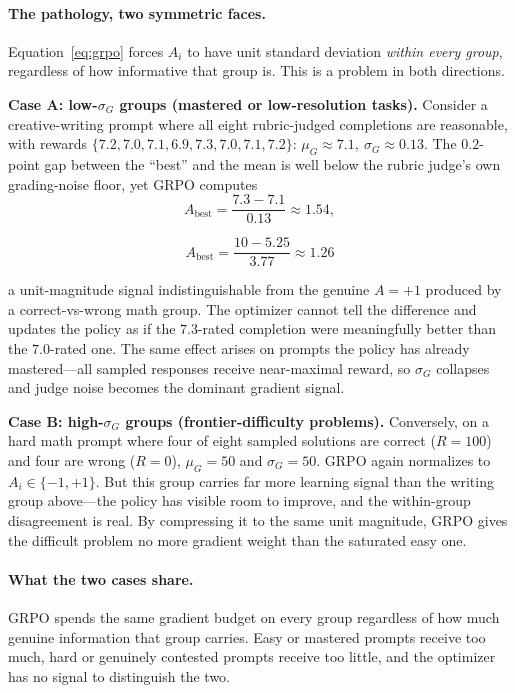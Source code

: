 \documentclass[10pt]{article}
\begin{document}
\paragraph{The pathology, two symmetric faces.}
Equation~\eqref{eq:grpo} forces $A_i$ to have unit standard deviation \emph{within
every group}, regardless of how informative that group is. This is a problem in
both directions.

\medskip
\noindent\textbf{Case A: low-$\sigma_G$ groups (mastered or low-resolution tasks).}
Consider a creative-writing prompt where all eight rubric-judged completions are
reasonable, with rewards $\{7.2, 7.0, 7.1, 6.9, 7.3, 7.0, 7.1, 7.2\}$:
$\mu_G \approx 7.1,\ \sigma_G \approx 0.13$. The $0.2$-point gap between the
``best'' and the mean is well below the rubric judge's own grading-noise floor,
yet GRPO computes
\[
A_{\text{best}} = \frac{7.3 - 7.1}{0.13} \approx 1.54,
\]

\[
A_{\text{best}} = \frac{10 - 5.25}{3.77} \approx 1.26
\]

a unit-magnitude signal indistinguishable from the genuine $A=+1$ produced by a
correct-vs-wrong math group. The optimizer cannot tell the difference and updates
the policy as if the $7.3$-rated completion were meaningfully better than the
$7.0$-rated one. The same effect arises on prompts the policy has already
mastered---all sampled responses receive near-maximal reward, so $\sigma_G$
collapses and judge noise becomes the dominant gradient signal.

\medskip
\noindent\textbf{Case B: high-$\sigma_G$ groups (frontier-difficulty problems).}
Conversely, on a hard math prompt where four of eight sampled solutions are
correct ($R=100$) and four are wrong ($R=0$), $\mu_G=50$ and $\sigma_G=50$. GRPO
again normalizes to $A_i \in \{-1, +1\}$. But this group carries far more
learning signal than the writing group above---the policy has visible room to
improve, and the within-group disagreement is real. By compressing it to the
same unit magnitude, GRPO gives the difficult problem no more gradient weight
than the saturated easy one.

\paragraph{What the two cases share.}
GRPO spends the same gradient budget on every group regardless of how much
genuine information that group carries. Easy or mastered prompts receive too
much, hard or genuinely contested prompts receive too little, and the optimizer
has no signal to distinguish the two.
\end{document}
